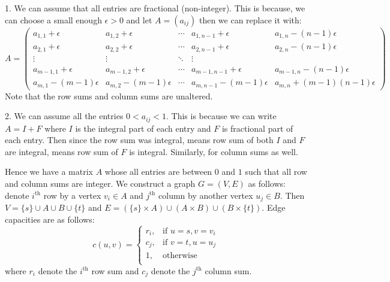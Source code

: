 \documentclass[12pt]{article}
\newcommand*{\union}{\cup}
\begin{document}
1. We can assume that all entries are fractional (non-integer). This is because, we can choose a small enough $\epsilon > 0$ and let $A = (a_{ij})$ then we can replace it with:
\begin{equation*}
A =
\begin{pmatrix}
a_{1,1}+\epsilon & a_{1,2}+\epsilon & \cdots & a_{1,n-1}+\epsilon & a_{1,n}-(n-1)\epsilon \\
a_{2,1}+\epsilon & a_{2,2}+\epsilon & \cdots & a_{2,n-1}+\epsilon & a_{2,n}-(n-1)\epsilon \\
\vdots  & \vdots  & \ddots & \vdots  \\
a_{m-1,1}+\epsilon & a_{m-1,2}+\epsilon & \cdots & a_{m-1,n-1}+\epsilon & a_{m-1,n}-(n-1)\epsilon \\
a_{m,1}-(m-1)\epsilon & a_{m,2}-(m-1)\epsilon & \cdots & a_{m,n-1}-(m-1)\epsilon & a_{m,n}+(m-1)(n-1)\epsilon
\end{pmatrix}
\end{equation*}
Note that the row sums and column sums are unaltered.

2. We can assume all the entries $0 < a_{ij} < 1$. This is because we can write $A = I + F$ where $I$ is the integral part of each entry and $F$ is fractional part of each entry. Then since the row sum was integral, means row sum of both $I$ and $F$ are integral, means row sum of $F$ is integral. Similarly, for column sums as well.
\newline

Hence we have a matrix $A$ whose all entries are between $0$ and $1$ such that all row and column sums are integer. We construct a graph $G = (V,E)$ as follows: denote $i^{\text{th}}$ row by a vertex $v_i \in A$ and $j^{\text{th}}$ column by another vertex $u_j \in B$. Then $V = \{s\} \union A \union B \union \{t\}$ and $E = (\{s\} \times A) \union (A \times B) \union (B \times \{t\})$. Edge capacities are as follows:
$$
c(u,v) =
     \begin{cases}
       r_i, &\text{if } u=s, v=v_i\\
       c_j, &\text{if } v=t, u=u_j\\
       1, &\text{otherwise }\\
     \end{cases}
$$
where $r_i$ denote the $i^{\text{th}}$ row sum and $c_j$ denote the $j^{\text{th}}$ column sum.
\end{document}
